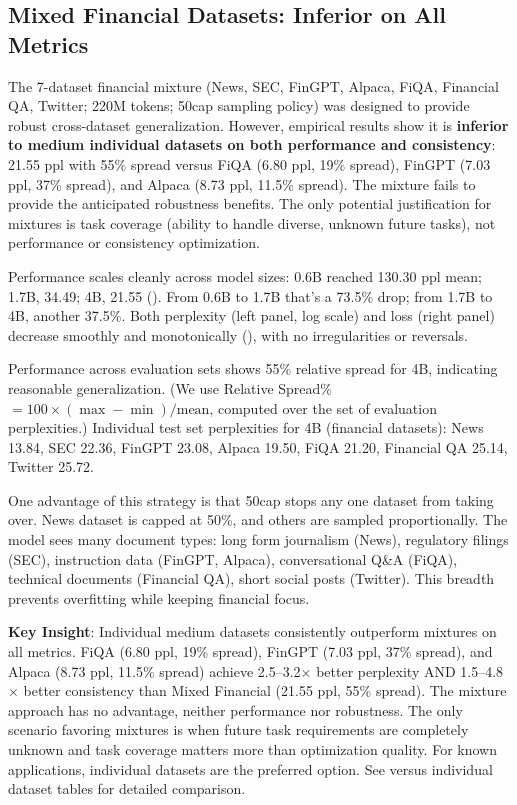 \subsection{Mixed Financial Datasets: Inferior on All Metrics}

The 7-dataset financial mixture (News, SEC, FinGPT, Alpaca, FiQA, Financial QA, Twitter; 220M tokens; 50cap sampling policy) was designed to provide robust cross-dataset generalization. However, empirical results show it is \textbf{inferior to medium individual datasets on both performance and consistency}: 21.55 ppl with 55\% spread versus FiQA (6.80 ppl, 19\% spread), FinGPT (7.03 ppl, 37\% spread), and Alpaca (8.73 ppl, 11.5\% spread). The mixture fails to provide the anticipated robustness benefits. The only potential justification for mixtures is task coverage (ability to handle diverse, unknown future tasks), not performance or consistency optimization.

Performance scales cleanly across model sizes: 0.6B reached 130.30 ppl mean; 1.7B, 34.49; 4B, 21.55 (). From 0.6B to 1.7B that's a 73.5\% drop; from 1.7B to 4B, another 37.5\%. Both perplexity (left panel, log scale) and loss (right panel) decrease smoothly and monotonically (), with no irregularities or reversals.

Performance across evaluation sets shows 55\% relative spread for 4B, indicating reasonable generalization. (We use Relative Spread\% $=100\times(\max-\min)/\text{mean}$, computed over the set of evaluation perplexities.) Individual test set perplexities for 4B (financial datasets): News 13.84, SEC 22.36, FinGPT 23.08, Alpaca 19.50, FiQA 21.20, Financial QA 25.14, Twitter 25.72.

One advantage of this strategy is that 50cap stops any one dataset from taking over. News dataset is capped at 50\%, and others are sampled proportionally. The model sees many document types: long form journalism (News), regulatory filings (SEC), instruction data (FinGPT, Alpaca), conversational Q\&A (FiQA), technical documents (Financial QA), short social posts (Twitter). This breadth prevents overfitting while keeping financial focus.

\textbf{Key Insight}: Individual medium datasets consistently outperform mixtures on all metrics. FiQA (6.80 ppl, 19\% spread), FinGPT (7.03 ppl, 37\% spread), and Alpaca (8.73 ppl, 11.5\% spread) achieve 2.5–3.2$\times$ better perplexity AND 1.5–4.8$\times$ better consistency than Mixed Financial (21.55 ppl, 55\% spread). The mixture approach has no advantage, neither performance nor robustness. The only scenario favoring mixtures is when future task requirements are completely unknown and task coverage matters more than optimization quality. For known applications, individual datasets are the preferred option. See  versus individual dataset tables for detailed comparison.

